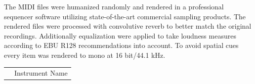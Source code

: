 The MIDI files were humanized randomly and rendered in a professional sequencer software utilizing state-of-the-art commercial sampling products. The rendered files were processed with convolutive reverb to better match the original recordings. Additionally equalization were applied to take loudness measures according to \textsc{EBU R128} recommendations into account. To avoid spatial cues every item was rendered to mono at 16 bit/44.1 kHz.

\begin{table}[h]
\center
\tiny
\begin{tabular}{c|r@{.}l|r@{.}l|l|l|l|l|l|l|l|l|l|l|l|l|l|l|l|l|l|l}
\toprule[1.5pt]

	\multicolumn{5}{l}{ } &
	\multicolumn{18}{c}{Instrument Name} \\


\end{tabular}
\end{table}
